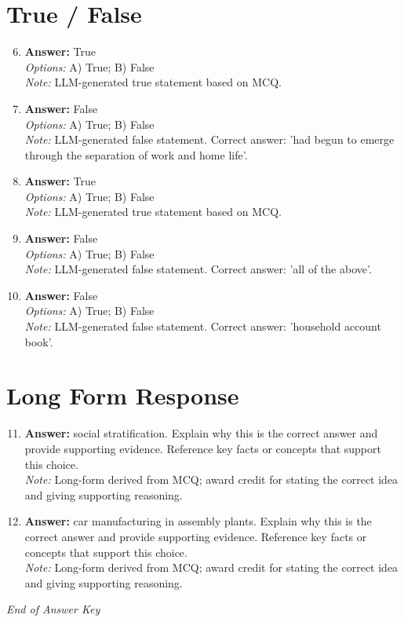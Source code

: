 \documentclass[12pt]{article}
\begin{document}
\section*{True / False}
\begin{enumerate}[label=\arabic*.]
\setcounter{enumi}{5}
\item \textbf{Answer:} True
\\ \textit{Options:} A) True; B) False
\\ \textit{Note:} LLM-generated true statement based on MCQ.
\item \textbf{Answer:} False
\\ \textit{Options:} A) True; B) False
\\ \textit{Note:} LLM-generated false statement. Correct answer: 'had begun to emerge through the separation of work and home life'.
\item \textbf{Answer:} True
\\ \textit{Options:} A) True; B) False
\\ \textit{Note:} LLM-generated true statement based on MCQ.
\item \textbf{Answer:} False
\\ \textit{Options:} A) True; B) False
\\ \textit{Note:} LLM-generated false statement. Correct answer: 'all of the above'.
\item \textbf{Answer:} False
\\ \textit{Options:} A) True; B) False
\\ \textit{Note:} LLM-generated false statement. Correct answer: 'household account book'.
\end{enumerate}

\section*{Long Form Response}
\begin{enumerate}[label=\arabic*.]
\setcounter{enumi}{10}
\item \textbf{Answer:} social stratification. Explain why this is the correct answer and provide supporting evidence. Reference key facts or concepts that support this choice.
\\ \textit{Note:} Long-form derived from MCQ; award credit for stating the correct idea and giving supporting reasoning.
\item \textbf{Answer:} car manufacturing in assembly plants. Explain why this is the correct answer and provide supporting evidence. Reference key facts or concepts that support this choice.
\\ \textit{Note:} Long-form derived from MCQ; award credit for stating the correct idea and giving supporting reasoning.
\end{enumerate}

\vfill
\noindent\textit{End of Answer Key}
\end{document}
